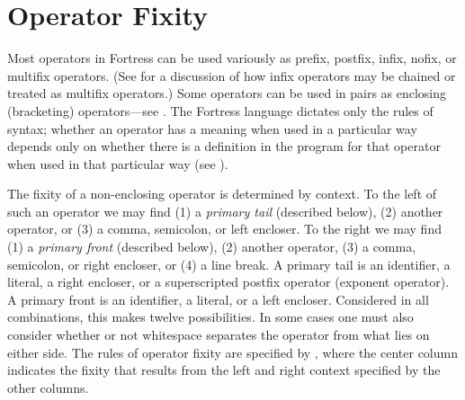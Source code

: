 %
%
%
%

\section{Operator Fixity}


Most operators in Fortress can be used variously as prefix, postfix,
infix, nofix, or multifix operators.
(See  for a discussion of how
infix operators may be chained
or treated as multifix operators.)
Some operators can be used in pairs
as enclosing (bracketing) operators---see .
The Fortress language
dictates only the rules of syntax; whether an operator has
a meaning when used in a particular way depends only on whether
there is a definition in the program for that operator when
used in that particular way (see ).

The fixity of a non-enclosing operator is determined by context.
To the left of such an operator we may find
(1) a \emph{primary tail} (described below),
(2) another operator, or
(3) a comma, semicolon, or left encloser.  To the right we may find
(1) a \emph{primary front} (described below),
(2) another operator, (3) a comma, semicolon, or right
encloser, or (4) a line break.
%
A primary tail is an identifier, a literal,
a right encloser, or a superscripted postfix operator (exponent operator).
A primary front is an identifier, a literal, or a left encloser.
%
Considered in all combinations, this makes twelve possibilities.
In some cases one must also consider whether or not whitespace separates the operator
from what lies on either side.  The rules of operator fixity are specified
by , where the center column indicates the fixity that results
from the left and right context specified by the other columns.


